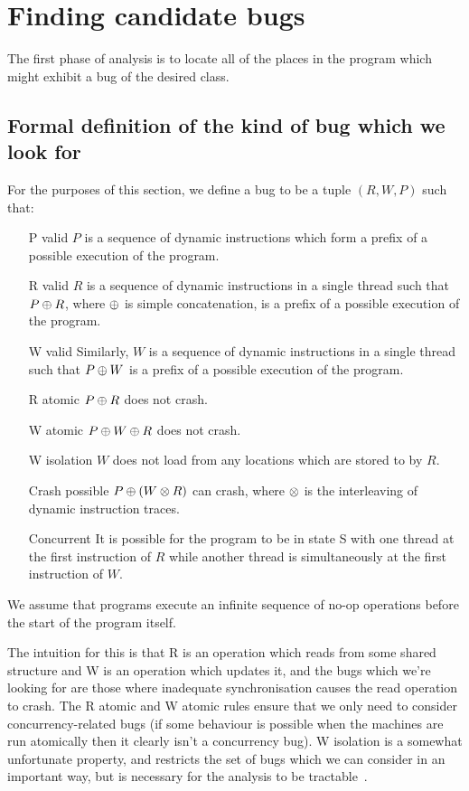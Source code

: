 \section{Finding candidate bugs}

The first phase of analysis is to locate all of the places in the program which might exhibit a bug of the desired class.

\subsection{Formal definition of the kind of bug which we look for}
\label{sect:finding_bugs:finding_candidate_bugs:formal_definition}
For the purposes of this section, we define a bug to be a tuple $(R, W, P)$ such that:

\begin{itemize}
\item[P valid] $P$ is a sequence of dynamic instructions which form a prefix of a possible execution of the program.
\item[R valid] $R$ is a sequence of dynamic instructions in a single thread such that $P \oplus R$, where $\oplus$ is simple concatenation, is a prefix of a possible execution of the program.
\item[W valid] Similarly, $W$ is a sequence of dynamic instructions in a single thread such that $P \oplus W$ is a prefix of a possible execution of the program.
\item[R atomic] $P \oplus R$ does not crash.
\item[W atomic] $P \oplus W \oplus R$ does not crash.
\item[W isolation] $W$ does not load from any locations which are stored to by $R$.
\item[Crash possible] $P \oplus (W \otimes R)$ can crash, where $\otimes$ is the interleaving of dynamic instruction traces.
\item[Concurrent] It is possible for the program to be in state S with one thread at the first instruction of $R$ while another thread is simultaneously at the first instruction of $W$.
\end{itemize}

We assume that programs execute an infinite sequence of no-op operations before the start of the program itself.

The intuition for this is that R is an operation which reads from some shared structure and W is an operation which updates it, and the bugs which we're looking for are those where inadequate synchronisation causes the read operation to crash.
The R atomic and W atomic rules ensure that we only need to consider concurrency-related bugs (if some behaviour is possible when the machines are run atomically then it clearly isn't a concurrency bug).
W isolation is a somewhat unfortunate property, and restricts the set of bugs which we can consider in an important way, but is necessary for the analysis to be tractable~\needCite{}.

